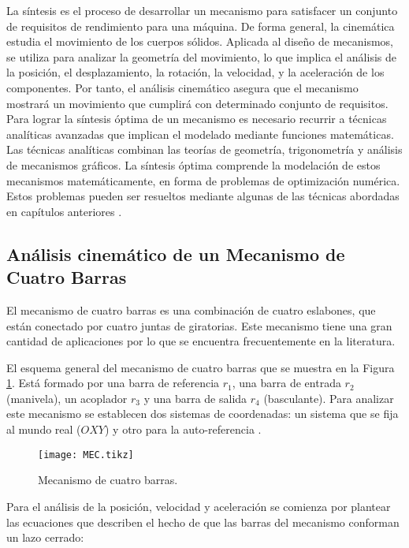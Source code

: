 La síntesis es el proceso de desarrollar un mecanismo para satisfacer un conjunto de requisitos de rendimiento para una máquina. De forma general, la cinemática estudia el movimiento de los cuerpos sólidos. Aplicada al diseño de mecanismos, se utiliza para analizar la geometría del movimiento, lo que implica el análisis de la posición, el desplazamiento, la rotación, la velocidad, y la aceleración de los componentes. Por tanto, el análisis cinemático asegura que el mecanismo mostrará un movimiento que cumplirá con determinado conjunto de requisitos. Para lograr la síntesis óptima de un mecanismo es necesario recurrir a técnicas analíticas avanzadas que implican el modelado mediante funciones matemáticas. Las técnicas analíticas combinan las teorías de geometría, trigonometría y análisis de mecanismos gráficos. La síntesis óptima comprende la modelación de estos mecanismos matemáticamente, en forma de problemas de optimización numérica. Estos problemas pueden ser resueltos mediante algunas de las técnicas abordadas en capítulos anteriores \cite{myszka2004machines}. 


\subsection{Análisis cinemático de un Mecanismo de Cuatro Barras}\label{sec:Análisis cinemático de un Mecanismo de Cuatro Barras}
El mecanismo de cuatro barras es una combinación de cuatro eslabones, que están conectado por cuatro juntas de giratorias. Este mecanismo tiene una gran cantidad de aplicaciones por lo que se encuentra frecuentemente en la literatura. 


El esquema general del mecanismo de cuatro barras que se muestra en la Figura \ref{fig:MEC}. Está formado por una barra de referencia $r_1$, una barra de entrada $r_2$ (manivela), un acoplador $r_3$ y una barra de salida $r_4$ (basculante). Para analizar este mecanismo se establecen dos sistemas de coordenadas: un sistema que se fija al mundo real ($OXY$) y otro para la auto-referencia \cite{herne1_two_swim_2016}.

\begin{figure}[htb]
    \centering
    \resizebox {\textwidth} {\height} {
     \texttt{[image: MEC.tikz]}
     }
    \caption{Mecanismo de cuatro barras.}
    \label{fig:MEC}
\end{figure}
Para el análisis de la posición, velocidad y aceleración se comienza por plantear las ecuaciones que describen el hecho de que las barras del mecanismo conforman un lazo cerrado:


